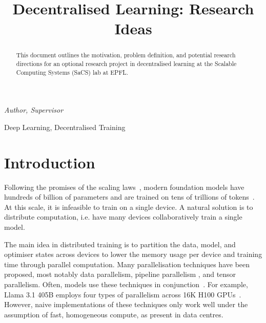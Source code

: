 \documentclass[conference, 10pt]{IEEEtran}
\begin{document}
\title{\LARGE Decentralised Learning: Research Ideas}

\author{
  \and
  \and
  \and
}

\maketitle

{\small\itshape {} Author,  Supervisor}

\begin{abstract}
  This document outlines the motivation, problem definition, and potential
  research directions for an optional research project in decentralised learning
  at the Scalable Computing Systems (SaCS) lab at EPFL.
\end{abstract}

\begin{IEEEkeywords}
Deep Learning, Decentralised Training
\end{IEEEkeywords}

\section{Introduction} 

Following the promises of the scaling laws~\cite{kaplan2020,hoffmann2022},
modern foundation models have hundreds of billion of parameters and are trained
on tens of trillions of
tokens~\cite{brown2023,touvron2023,dubey2024,openai2024,chowdhery2022,geminiteam2024}.
At this scale, it is infeasible to train on a single device. A natural solution
is to distribute computation, i.e. have many devices collaboratively train a
single model.

The main idea in distributed training is to partition the data, model, and
optimiser states across devices to lower the memory usage per device and
training time through parallel computation. Many parallelisation techniques have
been proposed, most notably data parallelism, pipeline parallelism , and tensor
parallelism. Often, models use these techniques in conjunction~\cite{dubey2024,
shoeybi2020}. For example, Llama 3.1 405B employs four types of parallelism
across 16K H100 GPUs~\cite{dubey2024}. However, naive implementations of these
techniques only work well under the assumption of fast, homogeneous compute, as
present in data centres.
\end{document}
